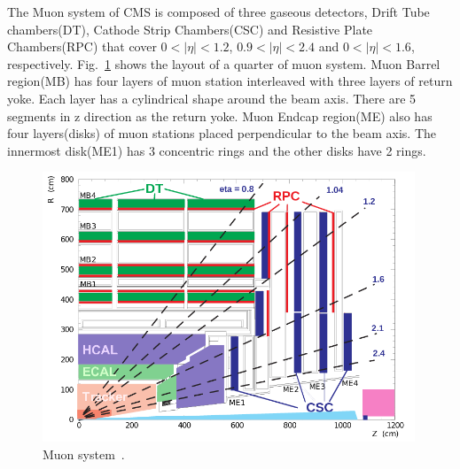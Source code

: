 The Muon system of CMS is composed of three gaseous detectors, 
Drift Tube chambers(DT), Cathode Strip Chambers(CSC) and Resistive Plate Chambers(RPC) 
that cover $0<|\eta|<1.2$, $0.9<|\eta|<2.4$ and $0<|\eta|<1.6$, respectively.
Fig.~\ref{fig:muon_system} shows the layout of a quarter of muon system. 
Muon Barrel region(MB) has four layers of muon station interleaved with 
three layers of return yoke. Each layer has a cylindrical shape around 
the beam axis. There are 5 segments in z direction as the return yoke. 
Muon Endcap region(ME) also has four layers(disks) of muon stations
placed perpendicular to the beam axis.
The innermost disk(ME1) has 3 concentric rings and the other disks 
have 2 rings. 
%
\begin{figure}[h] 
\vspace{1cm}
\includegraphics[width=0.99\textwidth]{figures/MuonSys-mod3.png}
\caption{Muon system~\cite{Kim:2012ix}.}
\label{fig:muon_system} 
\end{figure} 

